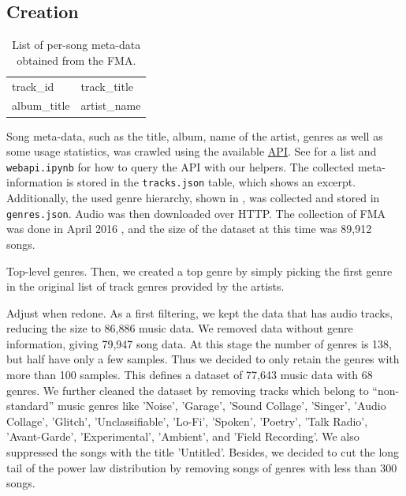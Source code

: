 \documentclass{article}
\newcommand{\todo}[1]{{\color{red} #1 }}
\begin{document}
\subsection{Creation} %

\begin{table}
	\centering
	\begin{tabular}{|ll|}
		\hline
		track\_id & track\_title \\
		album\_title & artist\_name \\
		\hline
	\end{tabular}
	\caption{List of per-song meta-data obtained from the FMA.}
	\label{tab:metadata}
\end{table}

Song meta-data, such as the title, album, name of the artist, genres as well as some usage statistics, was crawled using the available \href{https://freemusicarchive.org/api}{API}. See  for a list and \texttt{webapi.ipynb} for how to query the API with our helpers. The collected meta-information is stored in the \texttt{tracks.json} table, which  shows an excerpt. Additionally, the used genre hierarchy, shown in , was collected and stored in \texttt{genres.json}. Audio was then downloaded over HTTP. The collection of FMA was done in \todo{April 2016}, and the size of the dataset at this time was 89,912 songs.

\todo{Top-level genres.} Then, we created a top genre by simply picking the first genre in the original list of track genres provided by the artists.


\todo{Adjust when redone.}
As a first filtering, we kept the data that has audio tracks, reducing the size to 86,886 music data. 
We removed data without genre information, giving 79,947 song data.
At this stage the number of genres is 138, but half have only a few samples. Thus we decided to only retain the genres with more than 100 samples. This defines a dataset of 77,643 music data with 68 genres. We further cleaned the dataset by removing tracks which belong to ``non-standard'' music genres like 'Noise', 'Garage', 'Sound Collage', 'Singer', 'Audio Collage', 'Glitch', 'Unclassifiable', 'Lo-Fi', 'Spoken', 'Poetry', 'Talk Radio', 'Avant-Garde', 'Experimental', 'Ambient', and 'Field Recording'. We also suppressed the songs with the title 'Untitled'. Besides, we decided to cut the long tail of the power law distribution by removing songs of genres with less than 300 songs.
\end{document}
